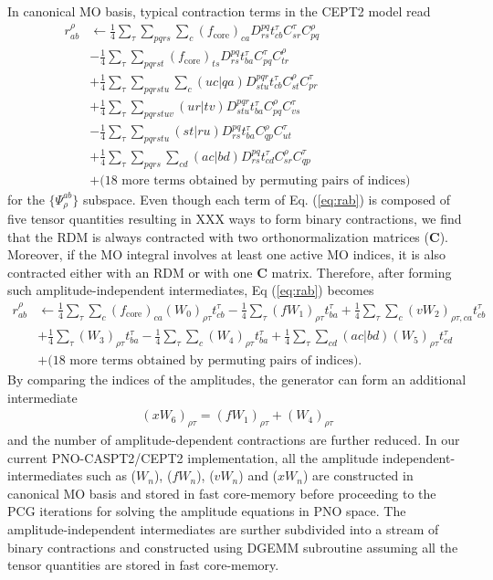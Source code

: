 \documentclass[aip,jcp,amsmath,twocolumn,floatfix,reprint,fleqn]{revtex4-1}
\begin{document}
%
In canonical MO basis, typical contraction terms in the CEPT2 model read
%
\begin{align}
  r_{ab}^\rho &\leftarrow \frac{1}{4}\sum_\tau\sum_{pqrs}\sum_{c}(f_\text{core})_{ca} D^{pq}_{rs} t_{cb}^\tau C_{sr}^\tau C_{pq}^\rho \nonumber \\
  &-\frac{1}{4}\sum_\tau\sum_{pqrst} (f_\text{core})_{ts} D^{pq}_{rs} t_{ba}^\tau C_{pq}^\tau C_{tr}^\rho \nonumber \\
  &+\frac{1}{4}\sum_\tau\sum_{pqrstu}\sum_c (uc|qa) D^{pqr}_{stu} t_{cb}^\tau C_{st}^\rho C_{pr}^\tau \nonumber \\
  &+\frac{1}{4}\sum_\tau\sum_{pqrstuv} (ur|tv) D^{pqr}_{stu} t_{ba}^\tau C_{pq}^\rho C_{vs}^\tau  \nonumber \\
  &-\frac{1}{4}\sum_\tau\sum_{pqrstu} (st|ru) D^{pq}_{rs} t_{ba}^\tau C_{qp}^\rho C_{ut}^\tau \nonumber \\
  &+\frac{1}{4}\sum_\tau\sum_{pqrs}\sum_{cd} (ac|bd) D^{pq}_{rs} t_{cd}^\tau C_{sr}^\rho C_{qp}^\tau \nonumber \\
  &+\text{(18 more terms obtained by permuting pairs of indices)} \label{eq:rab}
\end{align}
%
for the $\{\Psi_{\rho}^{ab}\}$ subspace.
%
Even though each term of Eq. (\ref{eq:rab}) is composed of five tensor quantities resulting in XXX ways to form binary contractions, we find that the RDM is always contracted with two orthonormalization matrices ($\mathbf{C}$).
%
Moreover, if the MO integral involves at least one active MO indices, it is also contracted either with an RDM or with one $\mathbf{C}$ matrix.
%
Therefore, after forming such amplitude-independent intermediates, Eq (\ref{eq:rab}) becomes
%
\begin{align}
  r_{ab}^\rho &\leftarrow \frac{1}{4}\sum_\tau\sum_{c}(f_\text{core})_{ca} (W_0)_{\rho\tau} t_{cb}^\tau - \frac{1}{4}\sum_\tau (fW_1)_{\rho\tau} t_{ba}^\tau +\frac{1}{4}\sum_\tau\sum_c (vW_2)_{\rho\tau,ca} t_{cb}^\tau \nonumber \\
  &+\frac{1}{4}\sum_\tau (W_3)_{\rho\tau} t_{ba}^\tau-\frac{1}{4}\sum_\tau\sum_c (W_4)_{\rho\tau} t_{ba}^\tau +\frac{1}{4}\sum_\tau\sum_{cd} (ac|bd) (W_5)_{\rho\tau} t_{cd}^\tau \nonumber \\
  &+\text{(18 more terms obtained by permuting pairs of indices)}. \label{eq:rab-2}
\end{align}
%
By comparing the indices of the amplitudes, the generator can form an additional intermediate
%
\begin{align}
  (xW_6)_{\rho\tau}=(fW_1)_{\rho\tau}+(W_4)_{\rho\tau} \label{eq:interm}
\end{align}
%
and the number of amplitude-dependent contractions are further reduced.
%
In our current PNO-CASPT2/CEPT2 implementation, all the amplitude independent-intermediates such as ($W_n$), ($fW_n$), ($vW_n$) and ($xW_n$) are constructed in canonical MO basis and stored in fast core-memory before proceeding to the PCG iterations for solving the amplitude equations in PNO space.
%
The amplitude-independent intermediates are surther subdivided into a stream of binary contractions and constructed using DGEMM subroutine assuming all the tensor quantities are stored in fast core-memory.
\end{document}
